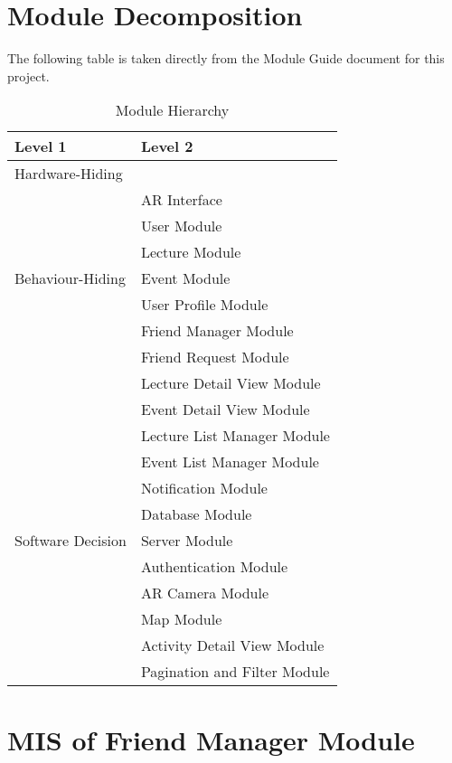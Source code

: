 \documentclass[12pt, titlepage]{article}
\begin{document}
\section{Module Decomposition}

The following table is taken directly from the Module Guide document for this project.

\begin{table}[h!]
\centering
\begin{tabular}{p{} p{}}
\toprule
\textbf{Level 1} & \textbf{Level 2}\\
\midrule

{Hardware-Hiding} & ~ \\
\midrule

\multirow{7}{0.3\textwidth}{Behaviour-Hiding}
& AR Interface\\
& User Module\\
& Lecture Module\\
& Event Module\\
& User Profile Module\\
& Friend Manager Module\\ 
& Friend Request Module\\ 
& Lecture Detail View Module\\
& Event Detail View Module\\
& Lecture List Manager Module\\
& Event List Manager Module\\
& Notification Module\\
\midrule

\multirow{3}{0.3\textwidth}{Software Decision}
& Database Module\\
& Server Module\\
& Authentication Module\\
& AR Camera Module\\
& Map Module\\
& Activity Detail View Module\\
& Pagination and Filter Module\\
\bottomrule

\end{tabular}
\caption{Module Hierarchy}
\label{TblMH}
\end{table}

\newpage

\section{MIS of Friend Manager Module} \label{mFM}
\end{document}
